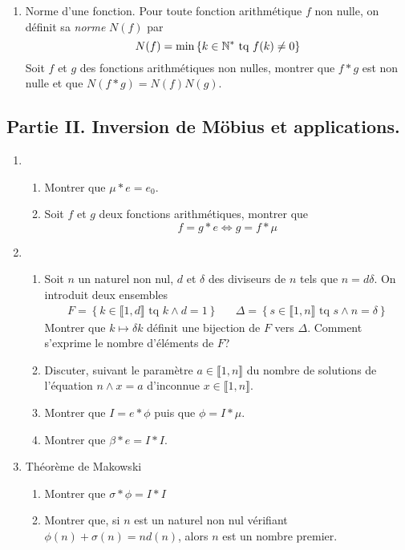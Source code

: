 \begin{enumerate}
\item Norme d'une fonction. Pour toute fonction arithmétique $f$ non nulle, on définit sa \emph{norme} $N(f)$ par 
\begin{displaymath}
 N(f) = \min \left\lbrace k\in \mathbb{N}^* \text{ tq } f(k)\neq 0\right\rbrace 
\end{displaymath}
Soit $f$ et $g$ des fonctions arithmétiques non nulles, montrer que $f*g$ est non nulle et que $N(f*g)=N(f)N(g)$.

\end{enumerate}

\subsection*{Partie II. Inversion de Möbius et applications.}
\begin{enumerate}
 \item 
\begin{enumerate}
 \item Montrer que $\mu * e = e_0$.
 \item Soit $f$ et $g$ deux fonctions arithmétiques, montrer que
\begin{displaymath}
 f = g * e \Leftrightarrow g = f * \mu
\end{displaymath}
\end{enumerate}

\item 
\begin{enumerate}
\item Soit $n$ un naturel non nul, $d$ et $\delta$ des diviseurs de $n$ tels que $n=d\delta$. On introduit deux ensembles
\begin{align*}
 F = \left\lbrace k\in \llbracket 1, d \rrbracket \text{ tq } k\wedge d = 1\right\rbrace & &
 \Delta = \left\lbrace s\in \llbracket 1, n\rrbracket \text{ tq } s\wedge n = \delta \right\rbrace
\end{align*}
Montrer que $k\mapsto \delta k$ définit une bijection de $F$ vers $\Delta$. Comment s'exprime le nombre d'éléments de $F$?
\item Discuter, suivant le paramètre $a\in \llbracket 1, n\rrbracket$ du nombre de solutions de l'équation $n\wedge x = a$ d'inconnue $x\in \llbracket 1, n\rrbracket$.
\item Montrer que $I = e * \phi$ puis que $\phi = I * \mu$.
\item Montrer que $\beta * e = I * I$.
\end{enumerate}

\item Théorème de Makowski
\begin{enumerate}
\item Montrer que $\sigma * \phi = I*I$
\item Montrer que, si $n$ est un naturel non nul vérifiant $\phi(n) + \sigma(n) = nd(n)$, alors $n$ est un nombre premier.
\end{enumerate}
\end{enumerate}
